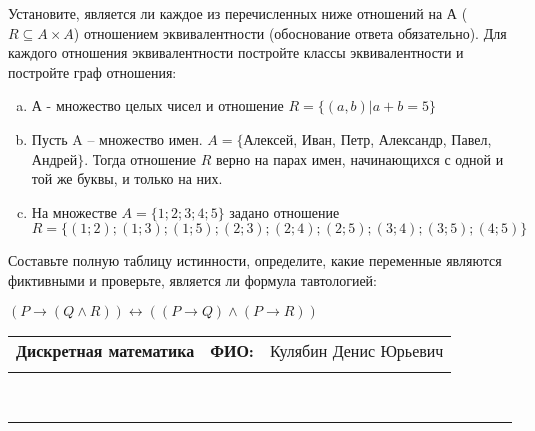 \documentclass[10pt]{exam}
\newcommand{\class}{Дискретная математика}
\newcommand{\examdate}{}
\begin{document}
\begin{questions}
\question
Установите, является ли каждое из перечисленных ниже отношений на А ($R \subseteq A \times A$) отношением эквивалентности (обоснование ответа обязательно). Для каждого отношения эквивалентности постройте классы 
эквивалентности и постройте граф отношения:
\begin{enumerate} [a)]\setcounter{enumi}{0}
\item А - множество целых чисел и отношение $R = \{(a,b)|a + b = 5\}$
\item Пусть A – множество имен. $A = \{ $Алексей, Иван, Петр, Александр, Павел, Андрей$ \}$. Тогда отношение $R $ верно на парах имен, начинающихся с одной и той же буквы, и только на них.
\item На множестве $A = \{1; 2; 3; 4; 5\}$ задано отношение $R = \{(1; 2); (1; 3); (1; 5); (2; 3); (2; 4); (2; 5); (3; 4); (3; 5); (4; 5)\}$
\end{enumerate}\question Составьте полную таблицу истинности, определите, какие переменные являются фиктивными и проверьте, является ли формула тавтологией:

$(P \rightarrow (Q \land R)) \leftrightarrow ((P \rightarrow Q) \land (P \rightarrow R))$

\end{questions}
\newpage
\begin{flushright}
\begin{tabular}{p{2.8in} r l}
\textbf{\class} & \textbf{ФИО:} &Кулябин Денис Юрьевич
\\

\textbf{\examdate} &&\\
\end{tabular}\\
\end{flushright}
\rule[1ex]{\textwidth}{.1pt}
\end{document}
